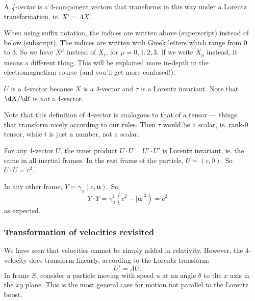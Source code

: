 \documentclass[a4paper]{article}
\begin{document}
\begin{defi}[4-vector]
  A \emph{4-vector} is a 4-component vectors that transforms in this way under a Lorentz transformation, ie. $X' = \Lambda X$.

  When using suffix notation, the indices are written above (superscript) instead of below (subscript). The indices are written with Greek letters which range from $0$ to $3$. So we have $X^\mu$ instead of $X_i$, for $\mu = 0, 1, 2, 3$. If we write $X_\mu$ instead, it means a different thing. This will be explained more in-depth in the electromagnetism course (and you'll get more confused!).
\end{defi}

$U$ is a 4-vector because $X$ is a 4-vector and $\tau$ is a Lorentz invariant. Note that $\d X/\d t$ is \emph{not} a 4-vector.

Note that this definition of 4-vector is analogous to that of a tensor --- things that transform nicely according to our rules. Then $\tau$ would be a scalar, ie. rank-0 tensor, while $t$ is just a number, not a scalar.

For any 4-vector $U$, the inner product $U\cdot U = U' \cdot U'$ is Lorentz invariant, ie. the same in all inertial frames. In the rest frame of the particle, $U = (c, 0)$. So $U\cdot U = c^2$.

In any other frame, $Y = \gamma_u(c, \mathbf{u})$. So
\[
  Y\cdot Y = \gamma_u^2 (c^2 - |\mathbf{u}|^2) = c^2
\]
as expected.

\subsubsection*{Transformation of velocities revisited}
We have seen that velocities cannot be simply added in relativity. However, the 4-velocity does transform linearly, according to the Lorentz transform:
\[
  U' = \Lambda U.
\]
In frame $S$, consider a particle moving with speed $u$ at an angle $\theta$ to the $x$ axis in the $xy$ plane. This is the most general case for motion not parallel to the Lorentz boost.
\end{document}
